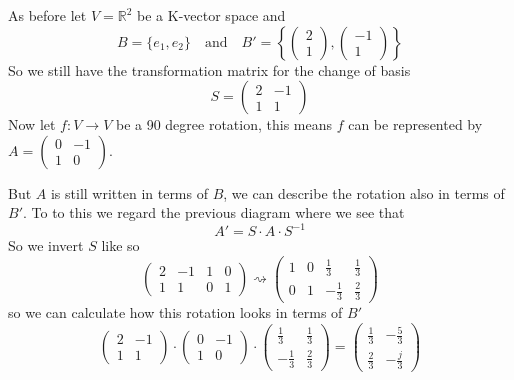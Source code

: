 \begin{example}
   As before let \(V = \mathbb{R}^2\) be a K-vector space and
   \[B = \{e_1, e_2\} \quad\text{and}\quad B' = \left\{\begin{pmatrix}2 \\1\end{pmatrix}, \begin{pmatrix}-1\\1\end{pmatrix}\right\}\]
   So we still have the transformation matrix for the change of basis
   \[S = \begin{pmatrix}2 & -1\\1 & 1\end{pmatrix}\]
   Now let \(f: V \to V\) be a 90 degree rotation, this means \(f\) can be represented by \(A = \begin{pmatrix}0 & -1\\1 & 0\end{pmatrix}\).

   \begin{center}
   \end{center}

   But \(A\) is still written in terms of \(B\), we can describe the rotation also in terms of \(B'\).
   To to this we regard the previous diagram where we see that
   \[A' = S \cdot A \cdot S^{-1}\]
   So we invert \(S\) like so
   \[
      \left(\begin{array}{cc|cc}
            2 & -1 & 1 & 0\\
            1 & 1 & 0 & 1
      \end{array}\right) \rightsquigarrow \left(\begin{array}{cc|cc}
            1 & 0 & \frac{1}{3} & \frac{1}{3}\\
            0 & 1 & -\frac{1}{3} & \frac{2}{3}
      \end{array}\right)
   \]
   so we can calculate how this rotation looks in terms of \(B'\)
   \[\begin{pmatrix}2 & -1\\1 & 1\end{pmatrix} \cdot \begin{pmatrix}0 & -1\\1 & 0\end{pmatrix} \cdot \begin{pmatrix}\frac{1}{3} & \frac{1}{3}\\ -\frac{1}{3} & \frac{2}{3}\end{pmatrix} = \begin{pmatrix}\frac{1}{3} & -\frac{5}{3}\\ \frac{2}{3} & -\frac{j}{3}\end{pmatrix}\]
\end{example}

